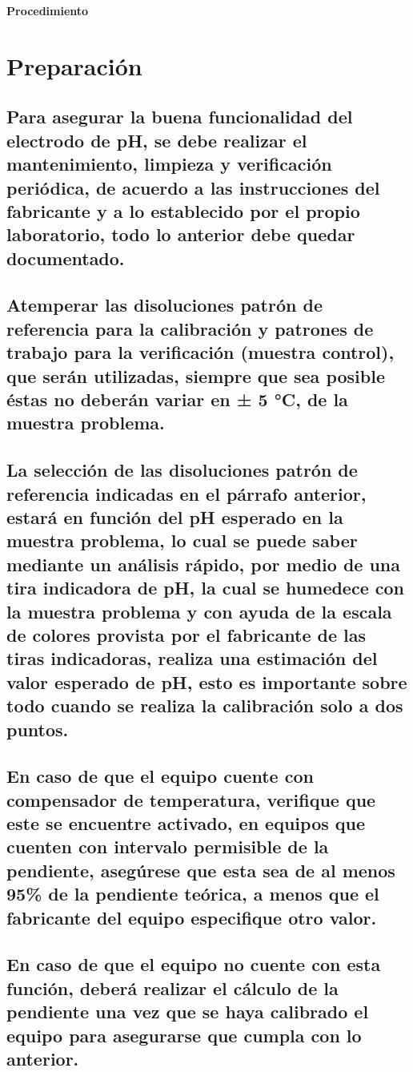 \documentclass[spanish,12pt,letterpaper,titlepage]{article}
\theoremstyle{definition}
\begin{document}
	\noindent\Large{\textbf{Procedimiento}}
	\normalsize
	\section{Preparación} \label{9.1}
	\subsection{Para asegurar la buena funcionalidad del electrodo de pH, se debe realizar el mantenimiento, limpieza y verificación periódica, de acuerdo a las instrucciones del fabricante y a lo establecido por el propio laboratorio, todo lo anterior debe quedar documentado.}\label{9.1.1}
	\subsection{Atemperar las disoluciones patrón de referencia para la calibración y patrones de trabajo para la verificación (muestra control), que serán utilizadas, siempre que sea posible éstas no deberán variar en ± 5 °C, de la muestra problema.}\label{9.1.2}
	\subsection{La selección de las disoluciones patrón de referencia indicadas en el párrafo anterior, estará en función del pH esperado en la muestra problema, lo cual se puede saber mediante un análisis rápido, por medio de una tira indicadora de pH, la cual se humedece con la muestra problema y con ayuda de la escala de colores provista por el fabricante de las tiras indicadoras, realiza una estimación del valor esperado de pH, esto es importante sobre todo cuando se realiza la calibración solo a dos puntos.}\label{9.1.3}
	\subsection{En caso de que el equipo cuente con compensador de temperatura, verifique que este se encuentre activado, en equipos que cuenten con intervalo permisible de la pendiente, asegúrese que esta sea de al menos 95\% de la pendiente teórica, a menos que el fabricante del equipo especifique otro valor.}\label{9.1.4}
 	\subsection{En caso de que el equipo no cuente con esta función, deberá realizar el cálculo de la pendiente una vez que se haya calibrado el equipo para asegurarse que cumpla con lo anterior.}\label{9.1.5}
\end{document}

